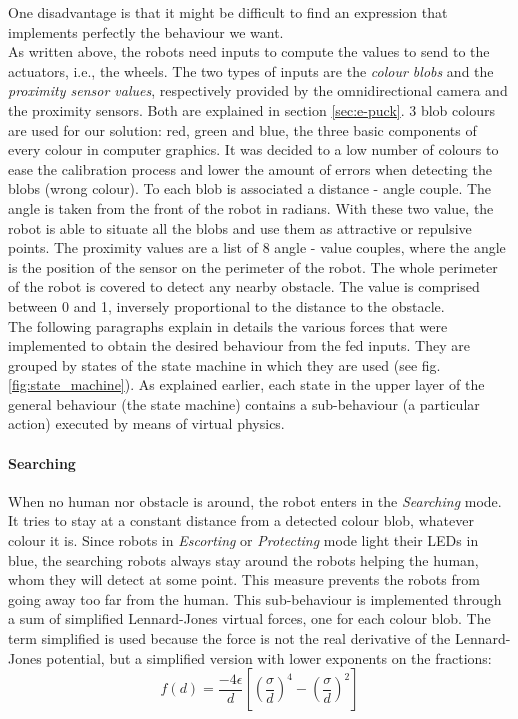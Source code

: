\documentclass[oneside, a4paper, 12pt]{memoir}
\begin{document}
	One disadvantage is that it might be difficult to find an expression that implements perfectly the behaviour we want.\\
	
	As written above, the robots need inputs to compute the values to send to the actuators, i.e., the wheels. The two types of inputs are the \emph{colour blobs} and the \emph{proximity sensor values}, respectively provided by the omnidirectional camera and the proximity sensors. Both are explained in section \ref{sec:e-puck}. 3 blob colours are used for our solution: red, green and blue, the three basic components of every colour in computer graphics. It was decided to a low number of colours to ease the calibration process and lower the amount of errors when detecting the blobs (wrong colour). To each blob is associated a distance - angle couple. The angle is taken from the front of the robot in radians. With these two value, the robot is able to situate all the blobs and use them as attractive or repulsive points. The proximity values are a list of 8 angle - value couples, where the angle is the position of the sensor on the perimeter of the robot. The whole perimeter of the robot is covered to detect any nearby obstacle. The value is comprised between 0 and 1, inversely proportional to the distance to the obstacle.\\
	
	The following paragraphs explain in details the various forces that were implemented to obtain the desired behaviour from the fed inputs. They are grouped by states of the state machine in which they are used (see fig. \ref{fig:state_machine}). As explained earlier, each state in the upper layer of the general behaviour (the state machine) contains a sub-behaviour (a particular action) executed by means of virtual physics.
		
			\paragraph{Searching}
			
				When no human nor obstacle is around, the robot enters in the \emph{Searching} mode. It tries to stay at a constant distance from a detected colour blob, whatever colour it is. Since robots in \emph{Escorting} or \emph{Protecting} mode light their LEDs in blue, the searching robots always stay around the robots helping the human, whom they will detect at some point. This measure prevents the robots from going away too far from the human. This sub-behaviour is implemented through a sum of simplified Lennard-Jones virtual forces, one for each colour blob. The term simplified is used because the force is not the real derivative of the Lennard-Jones potential, but a simplified version with lower exponents on the fractions:
				\begin{equation}
					f(d) = \frac{-4\epsilon}{d} \left[ \left(\frac{\sigma}{d}\right)^{4} - \left(\frac{\sigma}{d}\right)^2 \right]
					\label{eq:lennard-jones_force_simplified}
				\end{equation}
				
\end{document}
